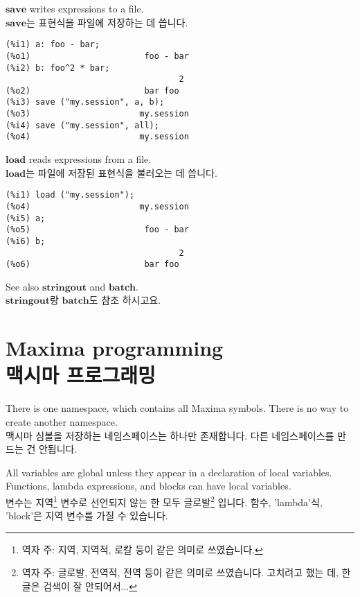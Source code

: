 \documentclass[12pt]{article}
\begin{document}
$\mathbf{save}$ writes expressions to a file. \\
$\mathbf{save}$는 표현식을 파일에 저장하는 데 씁니다.

\begin{verbatim}
(%i1) a: foo - bar;
(%o1)                       foo - bar
(%i2) b: foo^2 * bar;
                                   2
(%o2)                       bar foo
(%i3) save ("my.session", a, b);
(%o3)                      my.session
(%i4) save ("my.session", all);
(%o4)                      my.session
\end{verbatim}

$\mathbf{load}$ reads expressions from a file. \\
$\mathbf{load}$는 파일에 저장된 표현식을 불러오는 데 씁니다.

\begin{verbatim}
(%i1) load ("my.session");
(%o4)                      my.session
(%i5) a;
(%o5)                       foo - bar
(%i6) b;
                                   2
(%o6)                       bar foo
\end{verbatim}

See also $\mathbf{stringout}$ and $\mathbf{batch}$. \\
$\mathbf{stringout}$랑 $\mathbf{batch}$도 참조 하시고요.

\section{Maxima programming \\ 맥시마 프로그래밍}


There is one namespace, which contains all Maxima symbols.
There is no way to create another namespace. \\
맥시마 심볼을 저장하는 네임스페이스는 하나만 존재합니다.
다른 네임스페이스를 만드는 건 안됩니다.

All variables are global unless they appear in a declaration of local variables.
Functions, lambda expressions, and blocks can have local variables. \\
변수는 지역\footnote{역자 주: 지역, 지역적, 로칼 등이 같은 의미로 쓰였습니다.} 변수로 선언되지 않는 한 모두 글로발\footnote{역자 주: 글로발, 전역적, 전역 등이 같은 의미로 쓰였습니다. 고치려고 했는 데, 한글은 검색이 잘 안되어서...} 입니다.
함수, 'lambda'식, 'block'은 지역 변수를 가질 수 있습니다.
\end{document}
